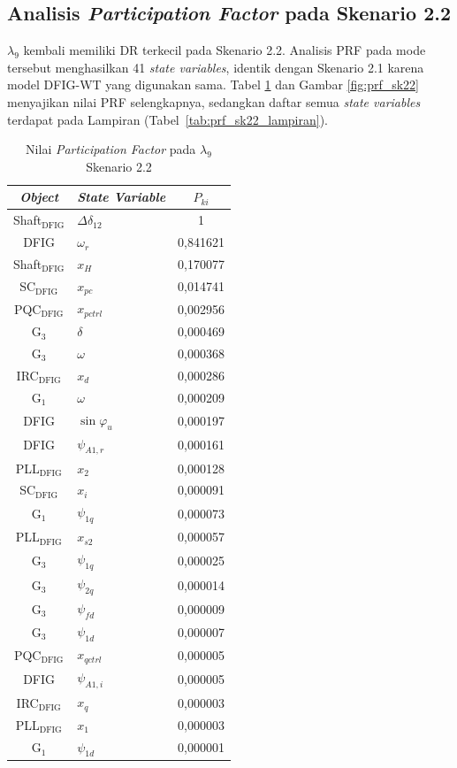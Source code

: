 \subsection{Analisis \textit{Participation Factor} pada Skenario 2.2}

$\lambda_9$ kembali memiliki DR terkecil pada Skenario 2.2. Analisis PRF pada
mode tersebut menghasilkan 41 \textit{state variables}, identik dengan Skenario
2.1 karena model DFIG-WT yang digunakan sama. Tabel \ref{tab:prf_sk22} dan Gambar \ref{fig:prf_sk22}
menyajikan nilai PRF selengkapnya, sedangkan daftar semua \textit{state
variables} terdapat pada Lampiran (Tabel~\ref{tab:prf_sk22_lampiran}).

\begin{table}[h]
	\caption{Nilai \textit{Participation Factor} pada $\lambda_9$ Skenario 2.2}
	\vspace{0.5em}
	\centering
	\fontsize{12}{14.4}\selectfont
	\setlength{\tabcolsep}{5pt}
	\begin{tabular}{c >{\centering\arraybackslash}p{5cm} c}
		\toprule
		\multicolumn{1}{c}{\textbf{\textit{Object}}} & \textbf{\textit{State
		Variable}} & \textbf{$P_{ki}$} \\
		\midrule
		Shaft$_\text{DFIG}$ & $\Delta\delta_{12}$ & 1          \\
		DFIG & $\omega_r$ & 0,841621   \\
		Shaft$_\text{DFIG}$ & $x_H$ & 0,170077   \\
		SC$_\text{DFIG}$ & $x_{pc}$ & 0,014741   \\
		PQC$_\text{DFIG}$ & $x_{pctrl}$ & 0,002956   \\
		G$_3$ & $\delta$ & 0,000469   \\
		G$_3$ & $\omega$ & 0,000368   \\
		IRC$_\text{DFIG}$ & $x_d$ & 0,000286   \\
		G$_1$ & $\omega$ & 0,000209   \\
		DFIG & $\sin\varphi_u$ & 0,000197   \\
		DFIG & $\psi_{A1,r}$ & 0,000161   \\
		PLL$_\text{DFIG}$ & $x_2$ & 0,000128   \\
		SC$_\text{DFIG}$ & $x_i$ & 0,000091   \\
		G$_1$ & $\psi_{1q}$ & 0,000073   \\
		PLL$_\text{DFIG}$ & $x_{s2}$ & 0,000057   \\
		G$_3$ & $\psi_{1q}$ & 0,000025   \\
		G$_3$ & $\psi_{2q}$ & 0,000014   \\
		G$_3$ & $\psi_{fd}$ & 0,000009   \\
		G$_3$ & $\psi_{1d}$ & 0,000007   \\
		PQC$_\text{DFIG}$ & $x_{qctrl}$ & 0,000005   \\
		DFIG & $\psi_{A1,i}$ & 0,000005   \\
		IRC$_\text{DFIG}$ & $x_q$ & 0,000003   \\
		PLL$_\text{DFIG}$ & $x_1$ & 0,000003   \\
		G$_1$ & $\psi_{1d}$ & 0,000001   \\
		\bottomrule
	\end{tabular}
	\label{tab:prf_sk22}
\end{table}

